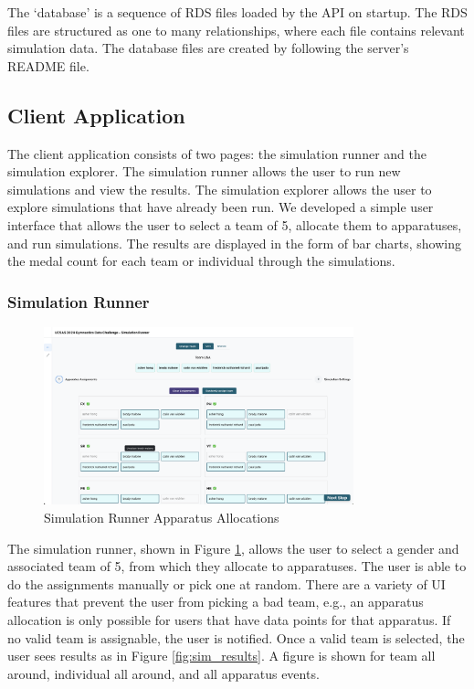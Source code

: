 \documentclass{article}
\begin{document}
The `database' is a sequence of RDS files loaded by the API on startup. The 
RDS files are structured as one to many relationships, where each file contains
relevant simulation data. The database files are created by following the server's 
README file.

\subsection{Client Application}

The client application consists of two pages: the simulation runner and the simulation 
explorer. The simulation runner allows the user to run new simulations and view the
results. The simulation explorer allows the user to explore simulations that have
already been run. We developed a simple user interface that allows the user to
select a team of 5, allocate them to apparatuses, and run simulations. The results 
are displayed in the form of bar charts, showing the medal count for each team 
or individual through the simulations.

\subsubsection{Simulation Runner}

\begin{figure}[H]
    \centering
    \includegraphics[width=0.8\textwidth]{./simulation_runner.png}
    \caption{Simulation Runner Apparatus Allocations}
    \label{fig:sim_runner}
\end{figure}

The simulation runner, shown in Figure \ref{fig:sim_runner}, allows the user to select a gender and associated team of 5, 
from which they allocate to apparatuses. The user is able to do the assignments manually or pick 
one at random. There are a variety of UI features that prevent the user from picking a bad team, 
e.g., an apparatus allocation is only possible for users that have data points for that apparatus. 
If no valid team is assignable, the user is notified. Once a valid team is selected, the user 
sees results as in Figure \ref{fig:sim_results}. A figure is shown for team all around, individual all around, and all apparatus events.
\end{document}
